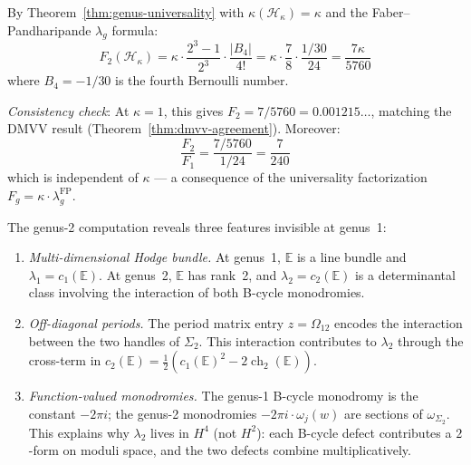 \begin{computation}\label{comp:heisenberg-F2-universality}
By Theorem~\ref{thm:genus-universality} with $\kappa(\mathcal{H}_\kappa) = \kappa$ and the Faber--Pandharipande $\lambda_g$ formula:
\begin{equation}
F_2(\mathcal{H}_\kappa) = \kappa \cdot \frac{2^3-1}{2^3} \cdot \frac{|B_4|}{4!} = \kappa \cdot \frac{7}{8} \cdot \frac{1/30}{24} = \frac{7\kappa}{5760}
\end{equation}
where $B_4 = -1/30$ is the fourth Bernoulli number.

\emph{Consistency check}: At $\kappa = 1$, this gives $F_2 = 7/5760 = 0.001215\ldots$, matching the DMVV result (Theorem~\ref{thm:dmvv-agreement}).  Moreover:
\begin{equation}
\frac{F_2}{F_1} = \frac{7/5760}{1/24} = \frac{7}{240}
\end{equation}
which is independent of $\kappa$ --- a consequence of the universality factorization $F_g = \kappa \cdot \lambda_g^{\mathrm{FP}}$.
\end{computation}

\begin{remark}\label{rem:genus2-structural}
The genus-2 computation reveals three features invisible at genus~1:
\begin{enumerate}
\item \emph{Multi-dimensional Hodge bundle.}  At genus~1, $\mathbb{E}$ is a line bundle and $\lambda_1 = c_1(\mathbb{E})$.  At genus~2, $\mathbb{E}$ has rank~2, and $\lambda_2 = c_2(\mathbb{E})$ is a determinantal class involving the interaction of both B-cycle monodromies.
\item \emph{Off-diagonal periods.}  The period matrix entry $z = \Omega_{12}$ encodes the interaction between the two handles of $\Sigma_2$.  This interaction contributes to $\lambda_2$ through the cross-term in $c_2(\mathbb{E}) = \frac{1}{2}(c_1(\mathbb{E})^2 - 2\operatorname{ch}_2(\mathbb{E}))$.
\item \emph{Function-valued monodromies.}  The genus-1 B-cycle monodromy is the constant $-2\pi i$; the genus-2 monodromies $-2\pi i \cdot \omega_j(w)$ are sections of $\omega_{\Sigma_2}$.  This explains why $\lambda_2$ lives in $H^4$ (not $H^2$): each B-cycle defect contributes a $2$-form on moduli space, and the two defects combine multiplicatively.
\end{enumerate}
\end{remark}

